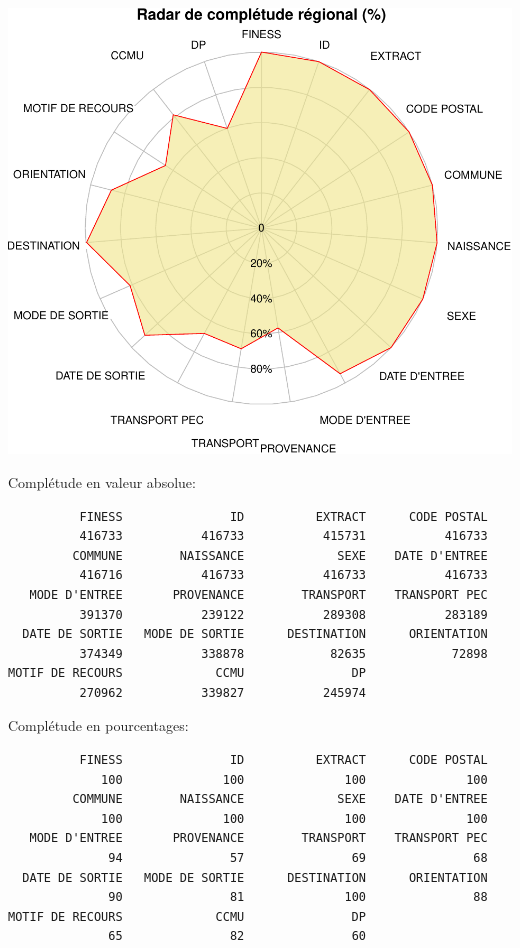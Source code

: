 \documentclass[]{article}
\begin{document}
\includegraphics{Figs/radar-1.pdf}

Complétude en valeur absolue:

\begin{verbatim}
          FINESS               ID          EXTRACT      CODE POSTAL 
          416733           416733           415731           416733 
         COMMUNE        NAISSANCE             SEXE    DATE D'ENTREE 
          416716           416733           416733           416733 
   MODE D'ENTREE       PROVENANCE        TRANSPORT    TRANSPORT PEC 
          391370           239122           289308           283189 
  DATE DE SORTIE   MODE DE SORTIE      DESTINATION      ORIENTATION 
          374349           338878            82635            72898 
MOTIF DE RECOURS             CCMU               DP 
          270962           339827           245974 
\end{verbatim}

Complétude en pourcentages:

\begin{verbatim}
          FINESS               ID          EXTRACT      CODE POSTAL 
             100              100              100              100 
         COMMUNE        NAISSANCE             SEXE    DATE D'ENTREE 
             100              100              100              100 
   MODE D'ENTREE       PROVENANCE        TRANSPORT    TRANSPORT PEC 
              94               57               69               68 
  DATE DE SORTIE   MODE DE SORTIE      DESTINATION      ORIENTATION 
              90               81              100               88 
MOTIF DE RECOURS             CCMU               DP 
              65               82               60 
\end{verbatim}
\end{document}
